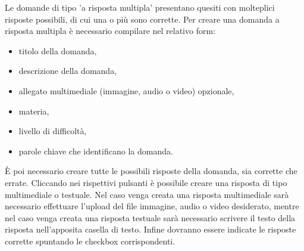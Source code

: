\documentclass[a4paper, titlepage]{article}
\begin{document}
	 Le domande di tipo 'a risposta multipla' presentano quesiti con molteplici risposte possibili, di cui una o più sono corrette.
	 Per creare una domanda a risposta multipla è necessario compilare nel relativo form:
	 \begin{itemize}
	 	\item titolo della domanda,
	 	\item descrizione della domanda,
	 	\item allegato multimediale (immagine, audio o video) opzionale,
	 	\item materia,
	 	\item livello di difficoltà,
	 	\item parole chiave che identificano la domanda.
	 \end{itemize}
	 È poi necessario creare tutte le possibili risposte della domanda, sia corrette che errate. Cliccando nei rispettivi pulsanti è possibile creare una risposta di tipo multimediale o testuale. Nel caso venga creata una risposta multimediale sarà necessario effettuare l'upload del file immagine, audio o video desiderato, mentre nel caso venga creata una risposta testuale sarà necessario scrivere il testo della risposta nell'apposita casella di testo.
	 Infine dovranno essere indicate le risposte corrette spuntando le checkbox corrispondenti.
	 
	 \newpage
\end{document}
